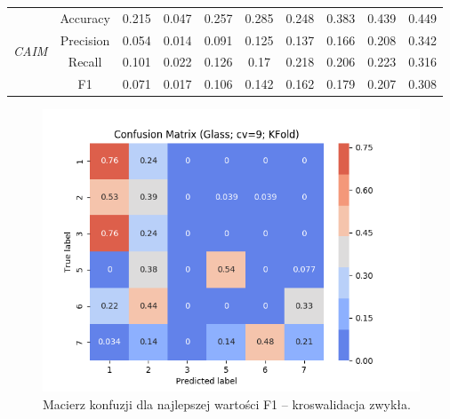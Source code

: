\begin{table}[H]
\begin{tabular}{|c|c|c|c|c|c|c|c|c|c|}
        \multirow{4}{*}{\textit{CAIM}}  & Accuracy & 0.215 & 0.047 & 0.257 & 0.285 & 0.248 & 0.383 & 0.439 & 0.449 \\ \cline{2-10}
                                         & Precision & 0.054 & 0.014 & 0.091 & 0.125 & 0.137 & 0.166 & 0.208 & 0.342 \\ \cline{2-10}
                                         & Recall & 0.101 & 0.022 & 0.126 & 0.17 & 0.218 & 0.206 & 0.223 & 0.316 \\ \cline{2-10}
                                         & F1 & 0.071 & 0.017 & 0.106 & 0.142 & 0.162 & 0.179 & 0.207 & 0.308 \\ \hline \hline
            \hline
        \end{tabular}
    \end{table}

\begin{figure}[H]
    \includegraphics[width=\textwidth]{img/conf_matrices/cm_Glass_cv9_KFold.png}
    \caption{Macierz konfuzji dla najlepszej wartości F1 -- kroswalidacja zwykła.}
\end{figure}